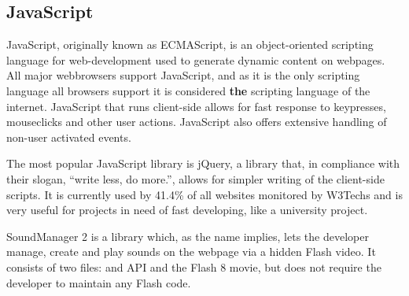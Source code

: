 \subsection{JavaScript}
JavaScript, originally known as ECMAScript, is an object-oriented scripting language for web-development used to generate dynamic content on webpages. All major webbrowsers support JavaScript, and as it is the only scripting language all browsers support it is considered \textbf{the} scripting language of the internet. JavaScript that runs client-side allows for fast response to keypresses, mouseclicks and other user actions. JavaScript also offers extensive handling of non-user activated events. 

The most popular JavaScript library is jQuery, a library that, in compliance with their slogan, ``write less, do more.'', allows for simpler writing of the client-side scripts. It is currently used by 41.4\% of all websites monitored by W3Techs \cite{W3Tech11} and is very useful for projects in need of fast developing, like a university project.

SoundManager 2 is a library which, as the name implies, lets the developer manage, create and play sounds on the webpage via a hidden Flash video. It consists of two files: and API and the Flash 8 movie, but does not require the developer to maintain any Flash code. \cite{Schiller07}
